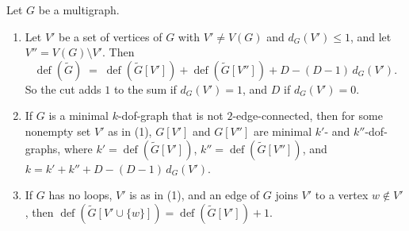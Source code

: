 \begin{lemma}
  \label{lem:cut-edge-decomposition}
  \leanok
  Let $G$ be a multigraph.
  \begin{enumerate}
    \item Let $V'$ be a set of vertices of $G$ with $V' \neq V(G)$
      and $d_G(V') \le 1$, and let $V'' = V(G) \setminus V'$. Then
      \[
        \operatorname{def}(\tilde G) \;=\;
        \operatorname{def}(\tilde G[V']) + \operatorname{def}(\tilde G[V''])
        + D - (D-1)\,d_G(V').
      \]
      So the cut adds $1$ to the sum if $d_G(V') = 1$, and $D$ if
      $d_G(V') = 0$.
    \item If $G$ is a minimal $k$-dof-graph that is not
      $2$-edge-connected, then for some nonempty set $V'$ as in (1),
      $G[V']$ and $G[V'']$ are minimal $k'$- and $k''$-dof-graphs, where
      $k' = \operatorname{def}(\tilde G[V'])$,
      $k'' = \operatorname{def}(\tilde G[V''])$, and
      $k = k' + k'' + D - (D-1)\,d_G(V')$.
    \item If $G$ has no loops, $V'$ is as in (1), and an edge of $G$
      joins $V'$ to a vertex $w \notin V'$, then
      $\operatorname{def}(\tilde G[V' \cup \{w\}]) =
      \operatorname{def}(\tilde G[V']) + 1$.
  \end{enumerate}
\end{lemma}

